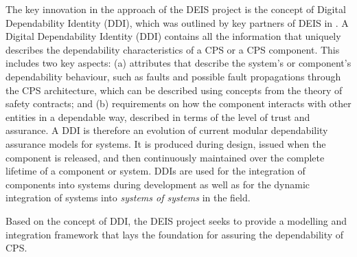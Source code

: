 The key innovation in the approach of the DEIS project is the concept of Digital Dependability Identity (DDI), which was outlined by key partners of DEIS in \cite{Schneider2015}. 
A Digital Dependability Identity (DDI) contains all the information that uniquely describes the dependability characteristics of a CPS or a CPS component. This includes two key aspects: (a) attributes that describe the system’s or component’s dependability behaviour, such as faults and possible fault propagations through the CPS architecture, which can be described using concepts from the theory of safety contracts; and (b) requirements on how the component interacts with other entities in a dependable way, described in terms of the level of trust and assurance.
A DDI is therefore an evolution of current modular dependability assurance models for systems. It is produced during design, issued when the component is released, and then continuously maintained over the complete lifetime of a component or system. DDIs are used for the integration of components into systems during development as well as for the dynamic integration of systems into \emph{systems of systems} in the field. 

Based on the concept of DDI, the DEIS project seeks to provide a modelling and integration framework that lays the foundation for assuring the dependability of CPS. 







